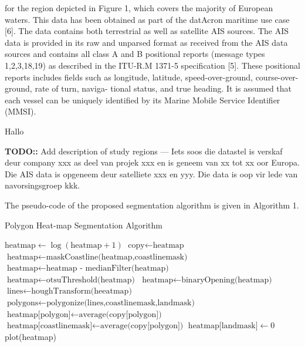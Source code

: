 \documentclass{article}
\begin{document}
for the region depicted in Figure 1,
which covers the majority of European waters. This data has
been obtained as part of the datAcron maritime use case [6].
The data contains both terrestrial as well as satellite AIS
sources. The AIS data is provided in its raw and unparsed
format as received from the AIS data sources and contains all
class A and B positional reports (message types 1,2,3,18,19)
as described in the ITU-R.M 1371-5 specification [5]. These
positional reports includes fields such as longitude, latitude,
speed-over-ground, course-over-ground, rate of turn, naviga-
tional status, and true heading. It is assumed that each vessel
can be uniquely identified by its Marine Mobile Service
Identifier (MMSI).

Hallo

\textbf{TODO::} Add description of study regions --- Iets soos die datastel is verskaf deur company xxx as deel van projek xxx en is geneem van xx tot xx oor Europa. Die AIS data is opgeneem deur satelliete xxx en yyy. Die data is oop vir lede van navorsingsgroep kkk.
 
The pseudo-code of the proposed segmentation algorithm is given in Algorithm 1. 

\begin{algorithm}
 \caption{Polygon Heat-map Segmentation Algorithm}\label{euclid}
 \begin{algorithmic}[1]
 \State $\textrm{heatmap} \gets \log(\textrm{heatmap}+1)$
 \State $\textrm{copy} \gets \textrm{heatmap}$
 \State $\textrm{heatmap} \gets \textrm{maskCoastline(heatmap,coastlinemask)}$
 \State $\textrm{heatmap} \gets \textrm{heatmap - medianFilter(heatmap)}$ 
 \State $\textrm{heatmap} \gets \textrm{otsuThreshold(heatmap)}$
 \State $\textrm{heatmap} \gets \textrm{binaryOpening(heatmap)}$
 \State $\textrm{lines} \gets \textrm{houghTransform(heeatmap)}$
 \State $\textrm{polygons} \gets \textrm{polygonize(lines,coastlinemask,landmask)}$
     \State $\textrm{heatmap[polygon]} \gets \textrm{average(copy[polygon])}$ 
 \EndFor
 \State $\textrm{heatmap[coastlinemask]} \gets \textrm{average(copy[polygon])}$
 \State $\textrm{heatmap[landmask]} \gets 0$
 \State plot(heatmap)
 
 \EndProcedure
 \end{algorithmic}
 \end{algorithm}
\end{document}
